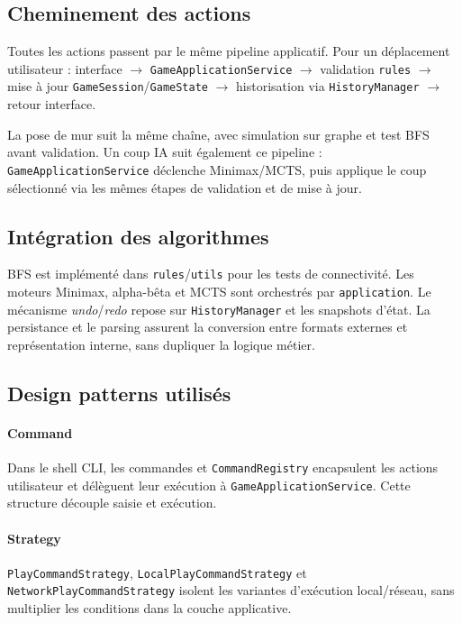 \documentclass[a4paper]{article}
\begin{document}
\subsection{Cheminement des actions}

Toutes les actions passent par le même pipeline applicatif. Pour un déplacement
utilisateur : interface $\rightarrow$ \texttt{GameApplicationService}
$\rightarrow$ validation \texttt{rules} $\rightarrow$ mise à jour
\texttt{GameSession}/\texttt{GameState} $\rightarrow$ historisation via
\texttt{HistoryManager} $\rightarrow$ retour interface.

La pose de mur suit la même chaîne, avec simulation sur graphe et test BFS
avant validation. Un coup IA suit également ce pipeline :
\texttt{GameApplicationService} déclenche Minimax/MCTS, puis applique le coup
sélectionné via les mêmes étapes de validation et de mise à jour.

\subsection{Intégration des algorithmes}

BFS est implémenté dans \texttt{rules}/\texttt{utils} pour les tests de
connectivité. Les moteurs Minimax, alpha-bêta et MCTS sont orchestrés par
\texttt{application}. Le mécanisme \emph{undo}/\emph{redo} repose sur
\texttt{HistoryManager} et les snapshots d'état. La persistance et le parsing
assurent la conversion entre formats externes et représentation interne, sans
dupliquer la logique métier.

\subsection{Design patterns utilisés}

\paragraph{Command}
Dans le shell CLI, les commandes et \texttt{CommandRegistry} encapsulent les
actions utilisateur et délèguent leur exécution à
\texttt{GameApplicationService}. Cette structure découple saisie et exécution.

\paragraph{Strategy}
\texttt{PlayCommandStrategy}, \texttt{LocalPlayCommandStrategy} et
\texttt{NetworkPlayCommandStrategy} isolent les variantes d'exécution
local/réseau, sans multiplier les conditions dans la couche applicative.
\end{document}
